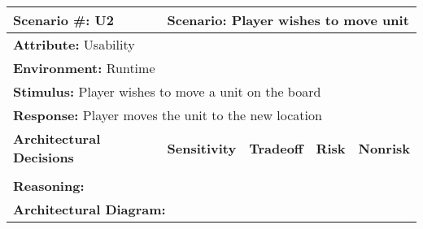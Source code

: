\begin{tabular}{|m{}|m{}|m{}
|m{}|m{}|m{}|}
  \hline
  {\bf Scenario \#:} U2 & \multicolumn{5}{m{0.75 \textwidth}|}{{\bf Scenario:}
  Player wishes to move unit} \\ \hline
  \multicolumn{6}{|m{0.9 \textwidth}|}{{\bf Attribute:} Usability} \\ \hline
  \multicolumn{6}{|m{0.9 \textwidth}|}{{\bf Environment:} Runtime} \\ \hline
  \multicolumn{6}{|m{0.9 \textwidth}|}{{\bf Stimulus:} Player wishes to move a
  unit on the board} \\ \hline
  \multicolumn{6}{|m{0.9 \textwidth}|}{{\bf Response:} Player moves the unit to
  the new location} \\ \hline
  \multicolumn{2}{|m{0.3 \textwidth}|}{\bf Architectural Decisions} &
  {\bf Sensitivity} & {\bf Tradeoff} & {\bf Risk} & {\bf Nonrisk} \\ \hline
  \multicolumn{2}{|m{0.3 \textwidth}|}{} &  &  &  &  \\ \hline
  \multicolumn{6}{|m{0.9 \textwidth}|}{{\bf Reasoning:} } \\ \hline
  \multicolumn{6}{|m{0.9 \textwidth}|}{{\bf Architectural Diagram:} } \\ \hline
\end{tabular}
